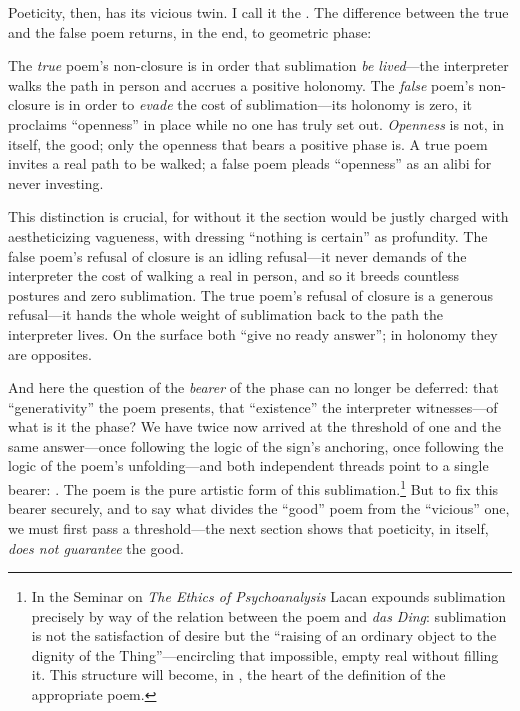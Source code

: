 Poeticity, then, has its vicious twin. I call it the . The difference between the true and the false poem returns, in the end, to geometric phase:

\begin{claim}
The \emph{true} poem's non-closure is in order that sublimation \emph{be lived}---the interpreter walks the path in person and accrues a positive holonomy. The \emph{false} poem's non-closure is in order to \emph{evade} the cost of sublimation---its holonomy is zero, it proclaims ``openness'' in place while no one has truly set out. \emph{Openness} is not, in itself, the good; only the openness that bears a positive phase is. A true poem invites a real path to be walked; a false poem pleads ``openness'' as an alibi for never investing.
\end{claim}

This distinction is crucial, for without it the section would be justly charged with aestheticizing vagueness, with dressing ``nothing is certain'' as profundity. The false poem's refusal of closure is an idling refusal---it never demands of the interpreter the cost of walking a real in person, and so it breeds countless postures and zero sublimation. The true poem's refusal of closure is a generous refusal---it hands the whole weight of sublimation back to the path the interpreter lives. On the surface both ``give no ready answer''; in holonomy they are opposites.

And here the question of the \emph{bearer} of the phase can no longer be deferred: that ``generativity'' the poem presents, that ``existence'' the interpreter witnesses---of what is it the phase? We have twice now arrived at the threshold of one and the same answer---once following the logic of the sign's anchoring, once following the logic of the poem's unfolding---and both independent threads point to a single bearer:  \parencite{lacan1998}. The poem is the pure artistic form of this sublimation.\footnote{In the Seminar on \emph{The Ethics of Psychoanalysis} \parencite{lacan1992} Lacan expounds sublimation precisely by way of the relation between the poem and \emph{das Ding}: sublimation is not the satisfaction of desire but the ``raising of an ordinary object to the dignity of the Thing''---encircling that impossible, empty real without filling it. This structure will become, in , the heart of the definition of the appropriate poem.} But to fix this bearer securely, and to say what divides the ``good'' poem from the ``vicious'' one, we must first pass a threshold---the next section shows that poeticity, in itself, \emph{does not guarantee} the good.
